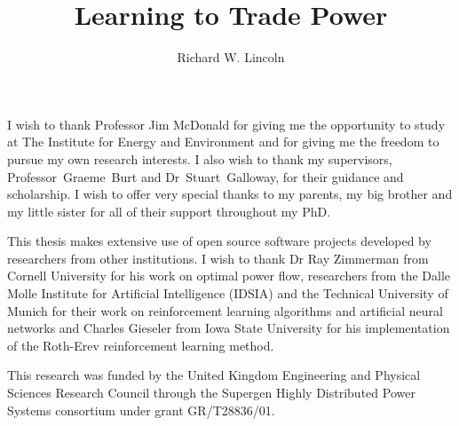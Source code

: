 \documentclass[12pt]{strath_thesis}
\title{Learning to Trade Power}
\author{Richard W. Lincoln}
\begin{document}
\maketitle

\setcounter{page}{1}

\declaration

\begin{acknowledgements}
I wish to thank Professor Jim McDonald for giving me the opportunity to study
at The Institute for Energy and Environment and for giving me the freedom
to pursue my own research interests.  I also wish to thank my supervisors,
Professor~Graeme~Burt and Dr~Stuart~Galloway, for their guidance and
 scholarship.  I wish to offer very special thanks to my parents, my big
brother and my little sister for all of their support throughout my PhD.

This thesis makes extensive use of open source software projects developed by
researchers from other institutions.  I wish to thank Dr Ray Zimmerman from
Cornell University for his work on optimal power flow, researchers from the Dalle Molle Institute for
Artificial Intelligence (IDSIA) and the Technical University of Munich for
their work on reinforcement learning algorithms and artificial neural networks
and Charles Gieseler from Iowa State University for his implementation of the
Roth-Erev reinforcement learning method.

This research was funded by the United Kingdom Engineering and Physical
Sciences Research Council through the Supergen Highly Distributed Power
Systems consortium under grant GR/T28836/01.
\end{acknowledgements}
\end{document}
